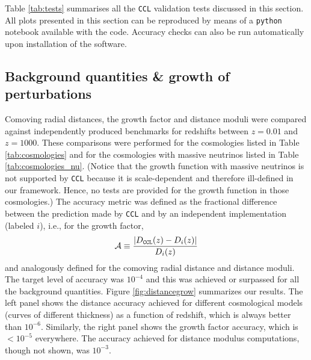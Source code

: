 \documentclass[\docopts]{\docclass}
\newcommand{\ccl}{{\tt CCL}\xspace}
\begin{document}


Table \ref{tab:tests} summarises all the \ccl validation tests discussed in this section. All plots presented in this section can be reproduced by means of a {\tt python} notebook available with the code. Accuracy checks can also be run automatically upon installation of the software.

\subsection{Background quantities \& growth of perturbations}

Comoving radial distances, the growth factor and distance moduli were compared against independently produced benchmarks for redshifts between $z = 0.01$ and $z = 1000$. These comparisons were performed for the cosmologies listed in Table \ref{tab:cosmologies} and for the cosmologies with massive neutrinos listed in Table \ref{tab:cosmologies_nu}. (Notice that the growth function with massive neutrinos is not supported by \ccl because it is scale-dependent and therefore ill-defined in our framework. Hence, no tests are provided for the growth function in those cosmologies.) The accuracy metric was defined as the fractional difference between the prediction made by \ccl and by an independent implementation (labeled $i$), i.e., for the growth factor,
\begin{equation}
  \mathcal{A} \equiv \frac{|D_{\tt CCL}(z)-D_{i}(z)|}{D_i(z)}
\end{equation}
and analogously defined for the comoving radial distance and distance moduli.
The target level of accuracy was $10^{-4}$ and this was achieved or surpassed for all the background quantities. Figure \ref{fig:distancegrow} summarizes our results. The left panel shows the distance accuracy achieved for different cosmological models (curves of different thickness) as a function of redshift, which is always better than $10^{-6}$. Similarly, the right panel shows the growth factor accuracy, which is $<10^{-5}$ everywhere. The accuracy achieved for distance modulus computations, though not shown, was $10^{-3}$.




\end{document}
